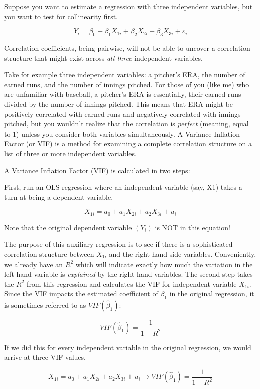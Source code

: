 \documentclass[
]{book}
\begin{document}
Suppose you want to estimate a regression with three independent variables, but you want to test for collinearity first.

\[Y_i = \beta_0 + \beta_1 X_{1i} + \beta_2 X_{2i} + \beta_3 X_{3i} + \varepsilon_i\]

Correlation coefficients, being pairwise, will not be able to uncover a correlation structure that might exist across \emph{all three} independent variables.

Take for example three independent variables: a pitcher's ERA, the number of earned runs, and the number of innings pitched. For those of you (like me) who are unfamiliar with baseball, a pitcher's ERA is essentially, their earned runs divided by the number of innings pitched. This means that ERA might be positively correlated with earned runs and negatively correlated with innings pitched, but you wouldn't realize that the correlation is \emph{perfect} (meaning, equal to 1) unless you consider both variables simultaneously. A Variance Inflation Factor (or VIF) is a method for examining a complete correlation structure on a list of three or more independent variables.

A Variance Inflation Factor (VIF) is calculated in two steps:

First, run an OLS regression where an independent variable (say, X1) takes a turn at being a dependent variable.

\[X_{1i} = a_0 + a_1 X_{2i} + a_2 X_{3i} + u_i\]

Note that the original dependent variable \((Y_i)\) is NOT in this equation!

The purpose of this auxiliary regression is to see if there is a sophisticated correlation structure between \(X_{1i}\) and the right-hand side variables. Conveniently, we already have an \(R^2\) which will indicate exactly how much the variation in the left-hand variable is \emph{explained} by the right-hand variables. The second step takes the \(R^2\) from this regression and calculates the VIF for independent variable \(X_{1i}\). Since the VIF impacts the estimated coefficient of \(\beta_1\) in the original regression, it is sometimes referred to as \(VIF(\hat{\beta}_1)\):

\[VIF(\hat{\beta}_1) = \frac{1}{1-R^2}\]

If we did this for every independent variable in the original regression, we would arrive at three VIF values.

\[X_{1i} = a_0 + a_1 X_{2i} + a_2 X_{3i} + u_i \rightarrow VIF(\hat{\beta}_1) = \frac{1}{1-R^2}\]
\end{document}
